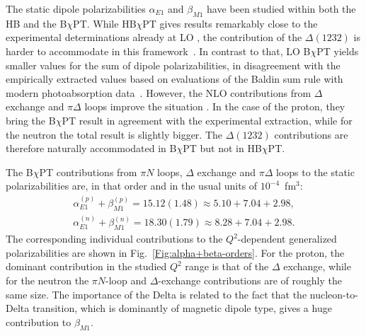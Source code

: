 \documentclass[12pt,preprint,tightenlines,
showpacs,preprintnumbers,amsmath,amssymb,
a4paper,nofootinbib]{revtex4-1}
\begin{document}
The static dipole polarizabilities $\alpha_{E1}$ and $\beta_{M1}$ have been  studied  within both the HB  and
the B$\chi$PT. While  HB$\chi$PT gives results
remarkably close to the experimental determinations already at LO \cite{Bernard:1995dp},
the contribution of the $\Delta(1232)$ is harder to accommodate in this framework~\cite{Hemmert:1996rw}. In contrast to that, LO  B$\chi$PT \cite{Bernard:1991rq,Bernard:1991ru}
yields smaller values for the sum of dipole polarizabilities, in disagreement with the empirically extracted values based on evaluations of the Baldin sum rule with modern photoabsorption data~\cite{Babusci:1997ij,Olm01,Gryniuk:2015aa}. However, the NLO contributions from $\Delta$ exchange and $\pi\Delta$ loops improve the situation \cite{Lensky:2009uv,Lensky:2015awa}.
In the case of the proton, they bring the B$\chi$PT result in agreement with the experimental extraction, while for the neutron the total result is slightly bigger. The $\Delta(1232)$ contributions are therefore naturally accommodated in  B$\chi$PT but not in HB$\chi$PT.

The B$\chi$PT contributions from $\pi N$ loops, $\Delta$ exchange and $\pi \Delta$ loops to the static polarizabilities are, in that order and in the usual units of $10^{-4}$~fm$^3$:
\begin{align}
\alpha_{E1}^{(p)}+\beta_{M1}^{(p)}=15.12(1.48) \approx 5.10+7.04+2.98, \label{Eq:alpha+betaProtonRealPoint}\\
\alpha_{E1}^{(n)}+\beta_{M1}^{(n)} =18.30(1.79)\approx 8.28+7.04+2.98. \label{Eq:alpha+betaNeutronRealPoint}
\end{align}
The corresponding individual contributions to the $Q^2$-dependent generalized polarizabilities are shown in Fig.~\ref{Fig:alpha+beta-orders}.
For the proton, the dominant contribution in the studied $Q^2$ range is that of the $\Delta$ exchange, while for the neutron the $\pi N$-loop and $\Delta$-exchange contributions are of roughly the same size.
The importance of the Delta is related to the fact that the nucleon-to-Delta transition, which is dominantly of magnetic dipole type, gives a huge contribution to $\beta_{M1}$. 
\end{document}
